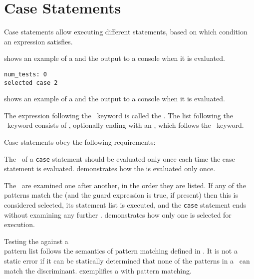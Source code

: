 \hypertarget{def-casestatementterm}{}
\section{Case Statements\label{sec:CaseStatements}}
Case statements allow executing different statements, based on which
condition an expression satisfies.

 shows an example of a \casestatementterm{}
and the output to a console when it is evaluated.

\begin{Verbatim}[fontsize=\footnotesize, frame=single]
num_tests: 0
selected case 2
\end{Verbatim}
 shows an example of a \casestatementterm{}
and the output to a console when it is evaluated.

\hypertarget{def-casediscriminantterm}{}
\hypertarget{def-casealternativeterm}{}
\hypertarget{def-otherwisecaseterm}{}
The expression following the \Tcase\ keyword is called the \emph{\casediscriminantterm}.
The list following the \Tof\ keyword consists of \emph{\casealternativesterm},
optionally ending with an \emph{\otherwisecaseterm}, which follows the \Totherwise\ keyword.

Case statements obey the following requirements:

 The \casediscriminantterm\ of a \texttt{case}
statement should be evaluated only once each time the case statement is evaluated.
%
 demonstrates how the \casediscriminantterm{}
is evaluated only once.

 The \casealternativesterm\ are examined
one after another, in the order they are listed.
If any of the patterns match the \casediscriminantterm{} (and the guard
expression is true, if present) then this \casealternativeterm{} is considered selected,
its statement list is executed, and the \texttt{case} statement ends without examining any further
\casealternativesterm.
%
 demonstrates how only one \casealternativeterm{} is selected
for execution.

 Testing the \casediscriminantterm{} against a \\
pattern list
follows the semantics of pattern matching defined in .
It is not a static error if it can be statically determined that none of the patterns in a
\casealternativeterm\ can match the discriminant.
%
 exemplifies a \casestatementterm{} with pattern matching.

